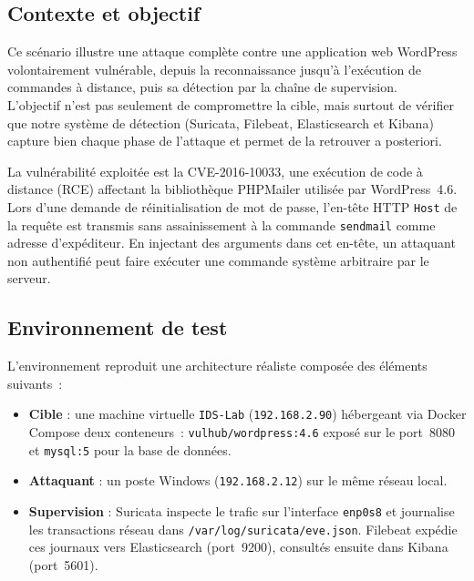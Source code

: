 \documentclass[12pt]{article}
\begin{document}
\subsection{Contexte et objectif}

Ce scénario illustre une attaque complète contre une application web WordPress volontairement vulnérable, depuis la reconnaissance jusqu'à l'exécution de commandes à distance, puis sa détection par la chaîne de supervision.
\\
L'objectif n'est pas seulement de compromettre la cible, mais surtout de vérifier que notre système de détection (Suricata, Filebeat, Elasticsearch et Kibana) capture bien chaque phase de l'attaque et permet de la retrouver a posteriori.

\vspace{0.4cm}

La vulnérabilité exploitée est la CVE-2016-10033, une exécution de code à distance (RCE) affectant la bibliothèque PHPMailer utilisée par WordPress~4.6. Lors d'une demande de réinitialisation de mot de passe, l'en-tête HTTP \texttt{Host} de la requête est transmis sans assainissement à la commande \texttt{sendmail} comme adresse d'expéditeur. En injectant des arguments dans cet en-tête, un attaquant non authentifié peut faire exécuter une commande système arbitraire par le serveur.


\subsection{Environnement de test}

L'environnement reproduit une architecture réaliste composée des éléments suivants~:

\begin{itemize}[nosep]
  \item \textbf{Cible} : une machine virtuelle \texttt{IDS-Lab} (\texttt{192.168.2.90}) hébergeant via Docker Compose deux conteneurs~: \texttt{vulhub/wordpress:4.6} exposé sur le port~8080 et \texttt{mysql:5} pour la base de données.
  \item \textbf{Attaquant} : un poste Windows (\texttt{192.168.2.12}) sur le même réseau local.
  \item \textbf{Supervision} : Suricata inspecte le trafic sur l'interface \texttt{enp0s8} et journalise les transactions réseau dans \texttt{/var/log/suricata/eve.json}. Filebeat expédie ces journaux vers Elasticsearch (port~9200), consultés ensuite dans Kibana (port~5601).
\end{itemize}
\end{document}
